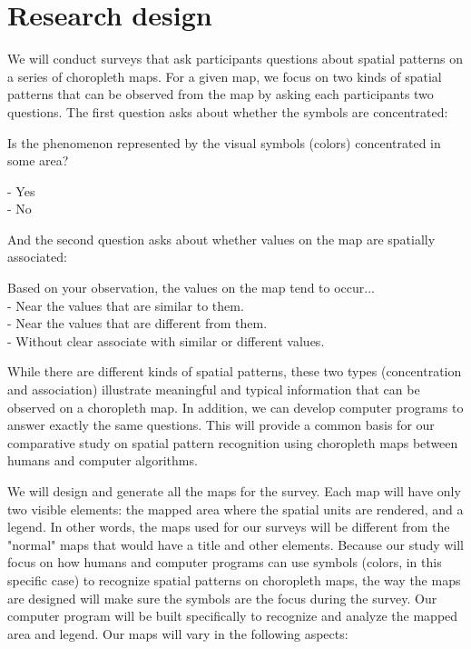 
\section{Research design}


We will conduct surveys that ask participants questions about spatial patterns on a series of choropleth maps. For a given map, we focus on two kinds of spatial patterns that can be observed from the map by asking each participants two questions. The first question asks about whether the symbols are concentrated:

Is the phenomenon represented by the visual symbols (colors) concentrated in some area? 

- Yes\\
- No

\noindent
And the second question asks about whether values on the map are spatially associated:

Based on your observation, the values on the map tend to occur...\\
- Near the values that are similar to them.\\
- Near the values that are different from them.\\
- Without clear associate with similar or different values.

\noindent
While there are different kinds of spatial patterns, these two types (concentration and association) illustrate meaningful and typical information that can be observed on a choropleth map. In addition, we can develop computer programs to answer exactly the same questions. This will provide a common basis for our comparative study on spatial pattern recognition using choropleth maps between humans and computer algorithms.

We will design and generate all the maps for the survey. Each map will have only two visible elements: the mapped area where the spatial units are rendered, and a legend. In other words, the maps used for our surveys will be different from the "normal" maps that would have a title and other elements. Because our study will focus on how humans and computer programs can use symbols (colors, in this specific case) to recognize spatial patterns on choropleth maps, the way the maps are designed will make sure the symbols are the focus during the survey. Our computer program will be built specifically to recognize and analyze the mapped area and legend. Our maps will vary in the following aspects:

